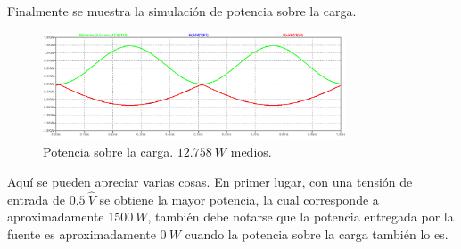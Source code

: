 Finalmente se muestra la simulación de potencia sobre la carga.
\begin{figure}[H]
	\centering
	\includegraphics[width=0.8\textwidth]{ImagenesSimulaciones/PRL.png}
	\caption{Potencia sobre la carga. $12.758 \ W$ medios.}
	\label{fig:porl}
\end{figure}
Aquí se pueden apreciar varias cosas. En primer lugar, con una tensión de entrada de $0.5  \ \hat{V}$ se obtiene la mayor potencia, la cual corresponde a aproximadamente $1500 \ W$, también debe notarse que la potencia entregada por la fuente es aproximadamente $0 \ W$ cuando la potencia sobre la carga también lo es.
